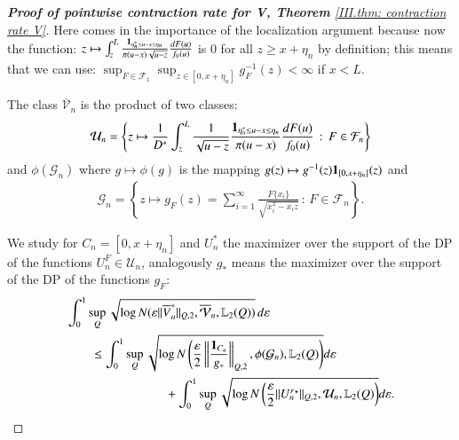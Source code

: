 \begin{proof}[\hypertarget{III.proof contraction pointwise V}{\textbf{Proof of pointwise contraction rate for V, Theorem} \ref{III.thm: contraction rate V}}]
    Here comes in the importance of the localization argument because now the function: $z \mapsto \int_z^L \frac{\mathbf{1}_{\eta_n^* \leq u - x \leq \eta_n}}{\pi(u-x) \sqrt{u-z}} \frac{dF(u)}{f_0(u)}$ is $0$ for all $z \geq x + \eta_n$ by definition; this means that we can use: $\sup_{F \in \mathcal{F}_1} \sup_{z \in [0, x+\eta_n]} g^{-1}_{\scriptscriptstyle{F}}(z) < \infty$ if $x < L$.
    
    The class $\overline{\mathcal{V}}_n$ is the product of two classes:
    \begin{align*}
        \mathcal{U}_n = \left\{ z \mapsto \frac{1}{D^*} \int_{z}^L \frac{1}{\sqrt{u-z}} \frac{\mathbf{1}_{\eta_n^* \leq u - x \leq \eta_n}}{\pi (u-x)}  \frac{dF(u)}{f_0(u)} \, : \, F \in \mathcal{F}_n \right\}
    \end{align*}
    and $\phi(\mathcal{G}_n)$ where $g \mapsto \phi(g)$ is the mapping $g(z) \mapsto g^{-1}(z) \mathbf{1}_{[0, x+\eta_n]}(z)$ and
    \begin{align*}
        \mathcal{G}_n = \left\{ z \mapsto g_{\scriptscriptstyle{F}}(z) = \sum_{i=1}^{\infty} \frac{F\{x_i\}}{ \sqrt{x_i^2 - x_i z}} \, : \,  F \in \mathcal{F}_n \right\}.
    \end{align*}
    
    We study for $C_n = [0, x + \eta_n]$ and $U_n^*$ the maximizer over the support of the DP of the functions $U_n^{\scriptscriptstyle{F}} \in \mathcal{U}_n$, analogously $g_*$ means the maximizer over the support of the DP of the functions $g_{\scriptscriptstyle{F}}$:
    \begin{align*}
        &\int_0^1 \sup_Q \sqrt{ \log N(\varepsilon \| \overline{V}_n^* \|_{Q, 2}, \overline{\mathcal{V}}_n, \mathbb{L}_2(Q)) } \, d\varepsilon \\
        &\quad \quad \leq \int_0^1 \sup_Q \sqrt{ \log N \left( \frac{\varepsilon}{2} \left\| \frac{\mathbf{1}_{C_n}}{g_*} \right\|_{Q, 2}, \phi(\mathcal{G}_n), \mathbb{L}_2(Q) \right) } d\varepsilon \\
        &\quad \quad \quad \quad  \quad \quad \quad \quad + \int_0^1 \sup_Q \sqrt{ \log N \left( \frac{\varepsilon}{2} \| U_n^{\scriptscriptstyle{F}\star} \|_{Q, 2}, \mathcal{U}_n, \mathbb{L}_2(Q) \right) } d\varepsilon.
    \end{align*}


\end{proof}
